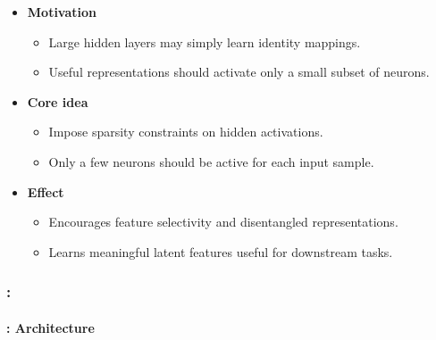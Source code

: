 \documentclass[xcolor=table]{beamer}
\begin{document}
	\begin{subsectionframe}
		\begin{itemize}
			
			\item \textbf{Motivation}
			\begin{itemize}
				\item Large hidden layers may simply learn identity mappings.
				\item Useful representations should activate only a small subset of neurons.
			\end{itemize}
			
			\item \textbf{Core idea}
			\begin{itemize}
				\item Impose sparsity constraints on hidden activations.
				\item Only a few neurons should be active for each input sample.
			\end{itemize}
			
			\item \textbf{Effect}
			\begin{itemize}
				\item Encourages feature selectivity and disentangled representations.
				\item Learns meaningful latent features useful for downstream tasks.
			\end{itemize}
			
		\end{itemize}
	\end{subsectionframe}
	
	\begin{frame}
		\frametitle{\insertshortsubtitle: \insertsection}
		\framesubtitle{\insertsubsection: Architecture}
		
		
	\end{frame}
	
\end{document}
